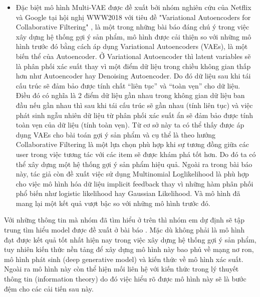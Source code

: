 \documentclass{article}[14pt]
\begin{document}
{\begin{itemize}
{    đó thì sẽ khó để tìm được sự tương đồng giữa các user trong việc tương tác 
    với item đó}; Bên cạnh đó có thể kể đến “Collaborative Denoising 
    Auto-Encoders for Top-N Recommender Systems” \cite{cde} nói về mô hình CDE 
    được đề xuất bởi nhóm nghiên cứu tại trường đại học Beihang, Trung Quốc, 
    cũng là một bài báo nổi bật trong việc áp dụng mô hình Autoencoder, mô hình 
    này sử dụng một biến thể của Autoencoder là Denoising Autoencoder để xây 
    dựng hệ thống gợi ý sản phẩm, điểm khác biệt của mô hình CDE là input của mô 
    hình sẽ được thêm nhiễu nhằm giúp mô hình tránh tình trạng overfitting. Và 
    theo bài báo thì CDE có được kết quả vượt trội hơn so với những state of the 
    art tại thời điểm được đề xuất.
\item	Đặc biệt mô hình Multi-VAE được đề xuất bởi nhóm nghiên cứu của Netflix và 
Google tại hội nghị WWW2018 với tiêu đề "Variational Autoencoders for 
Collaborative Filtering" \cite{mvae}, là một trong những bài báo đáng chú ý trong việc xây 
dựng hệ thống gợi ý sản phẩm, mô hình được cải thiện so với những mô hình trước 
đó bằng cách áp dụng Variational Autoencoders (VAEs), là một biến thể của 
Autoencoder. Ở Variational Autoencoder thì latent variables sẽ là phân phối xác 
suất thay vì một điểm dữ liệu trong chiều không gian thấp hơn như Autoencoder 
hay Denoising Autoencoder. Do đó dữ liệu sau khi tái cấu trúc sẽ đảm bảo được 
tính chất “liên tục” và “toàn vẹn” cho dữ liệu. Điều đó có nghĩa là 2 điểm dữ 
liệu gần nhau trong không gian dữ liệu ban đầu nếu gần nhau thì sau khi tái cấu 
trúc sẽ gần nhau (tính liên tục) và việc phát sinh ngẫu nhiên dữ liệu từ phân 
phối xác suất ẩn sẽ đảm bảo được tính toàn vẹn của dữ liệu (tính toàn vẹn). Từ 
cơ sở này ta có thể thấy được áp dụng VAEs cho bài toán gợi ý sản phẩm và cụ 
thể là theo hướng Collaborative Filtering là một lựa chọn phù hợp khi sự tương 
đồng giữa các user trong việc tương tác với các item sẽ được khám phá tốt hơn. 
Do đó ta có thể xây dựng một hệ thống gợi ý sản phẩm hiệu quả. Ngoài ra trong 
bài báo này, tác giả còn đề xuất việc sử dụng Multinomial Loglikelihood là phù 
hợp cho việc mô hình hóa dữ liệu implicit feedback thay vì những hàm phân phối 
phổ biến như logistic likelihood hay Gaussian Likelihood. Và mô hình đã mang 
lại một kết quả vượt bậc so với những mô hình trước đó.

\end{itemize}
Với những thông tin mà nhóm đã tìm hiểu ở trên thì nhóm em dự định sẽ tập trung 
tìm hiểu model được đề xuất ở bài báo . Mặc dù không phải là mô hình đạt 
được kết quả tốt nhất hiện nay trong việc xây dựng hệ thống gợi ý sản phẩm, tuy 
nhiên kiến thức nền tảng để xây dựng mô hình này bao phủ về mạng nơ ron, mô 
hình phát sinh (deep generative model) và kiến thức về mô hình xác suất. Ngoài 
ra mô hình này còn thể hiện mối liên hệ với kiến thức trong lý thuyết thông tin 
(information theory) do đó việc hiểu rõ được mô hình này sẽ là bước đệm cho các 
cải tiến sau này.
    
}
\end{document}
